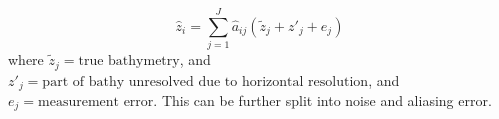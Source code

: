 \begin{itemize}
\begin{itemize}
            \end{itemize}
\end{itemize}


\color{blue}
\begin{equation}
      \hat{z}_i = \sum_{j=1}^{J}{\hat{a}_{ij}} (\tilde{z}_j + {z'}_j+e_j)
\end{equation}
where $\tilde{z}_j = \text{true bathymetry}$, and ${z'}_j = \text{part of bathy unresolved due to horizontal resolution}$, and $e_j = \text{measurement error}$. This can be further split into noise and aliasing error. \parencite{Plant2002}
\color{black}